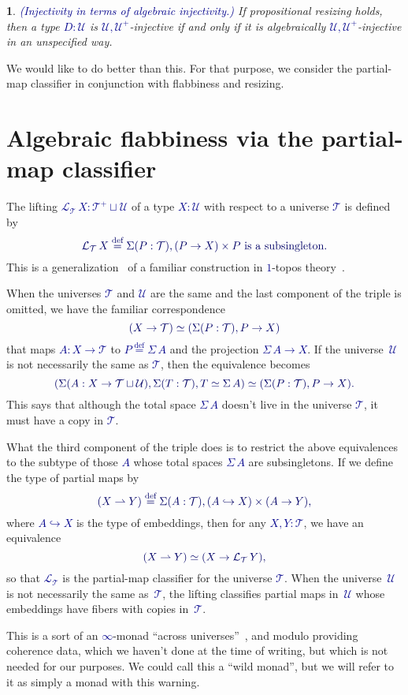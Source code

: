 \documentclass[10pt]{article}
\newcommand{\db}{\textcolor{darkblue}}
\newcommand{\emb}{\hookrightarrow}
\newcommand{\partialto}{\rightharpoonup}
\newcommand{\df}[1]{\emph{\db{#1}}}
\newcommand{\m}[1]{\db{$#1$}}
\newcommand{\M}[1]{\[\db{#1}\]}
\newcommand{\U}{\mathcal{U}}
\newcommand{\T}{\mathcal{T}}
\newcommand{\Lift}{\mathcal{L}}
\newcommand{\eqdef}{\overset{\text{def}}{=}}
\newtheorem{numbered}{}
\theoremstyle{definition}
\begin{document}
\begin{numbered} \label{worse} \df{(Injectivity in terms of algebraic injectivity.)}
  If propositional resizing holds, then a type \m{D : \U} is \m{\U,\U^+}-injective if and only if it is algebraically \m{\U,\U^+}-injective in an unspecified way.
\end{numbered}
\noindent We would like to do better than this. For that purpose, we consider
the partial-map classifier in conjunction with flabbiness and resizing.

\section{Algebraic flabbiness via the partial-map classifier}

The lifting \m{\Lift_{\T} \, X : \T^+ \sqcup \U} of a type \m{X:\U}
with respect to a universe \m{\T} %
is defined by
%
\M{ \Lift_{\T}\, X \eqdef \Sigma (P : \T), (P \to X) \times
  \text{\m{P} is a subsingleton}.  }
%
This is a generalization~\cite{MR3695545} of a familiar construction
in \m{1}-topos theory~\cite{MR1173017}.

When the universes \m{\T} and \m{\U} are the same and the last
component of the triple is omitted, we have the familiar
correspondence
%
\M{
  (X \to \T) \simeq (\Sigma (P : \T), P \to X)
}
%
that maps \m{A : X \to \T} to \m{P \eqdef \Sigma \, A} and the
projection \m{\Sigma \, A \to X}.  If the universe~\m{\U} is not
necessarily the same as \m{\T}, then the equivalence becomes
%
\M{
  (\Sigma (A : X \to \T \sqcup \U), \Sigma(T : \T), T \simeq \Sigma \, A) \simeq (\Sigma (P : \T), P \to X).
}
%
This says that although the total space \m{\Sigma \, A} doesn't
live in the universe \m{\T}, it must have a copy in \m{\T}.

What the third component of the triple does is to restrict the above
equivalences to the subtype of those \m{A} whose total spaces \m{\Sigma
  \, A} are subsingletons. If we define the type of partial maps by
%
\M{(X \partialto Y) \eqdef \Sigma (A : \T), (A \emb X) \times (A \to Y),
}
%
where \m{A \emb X} is the type of embeddings, then for any \m{X,Y :
  \T}, we have an equivalence
%
\M{
  (X \partialto Y)
  \simeq (X \to \Lift_{\T} \, Y),
}
%
so that \m{\Lift_{\T}} is the partial-map classifier for the universe
\m{\T}.  When the universe~\m{\U} is not necessarily the same
as~\m{\T}, the lifting classifies partial maps in~\m{\U} whose
embeddings have fibers with copies in~\m{\T}.

This is a sort of an \m{\infty}-monad ``across
universes''~\cite{TypeTopology}, and modulo providing coherence data,
which we haven't done at the time of writing, but which is not needed
for our purposes. We could call this a ``wild monad'', but we will
refer to it as simply a monad with this warning.
\end{document}
